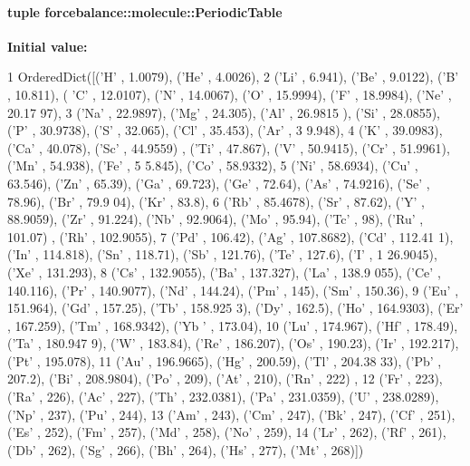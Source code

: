 \hypertarget{namespaceforcebalance_1_1molecule_a00baf2798fd1a1e41c0364e94eafd133}{
\paragraph[{\-Periodic\-Table}]{\setlength{\rightskip}{0pt plus 5cm}tuple {\bf forcebalance\-::molecule\-::\-Periodic\-Table}}}\label{namespaceforcebalance_1_1molecule_a00baf2798fd1a1e41c0364e94eafd133}
{\bfseries \-Initial value\-:}
\begin{DoxyCode}
1 OrderedDict([('H' , 1.0079), ('He' , 4.0026), 
2                              ('Li' , 6.941), ('Be' , 9.0122), ('B' , 10.811), (
      'C' , 12.0107), ('N' , 14.0067), ('O' , 15.9994), ('F' , 18.9984), ('Ne' , 20.17
      97),
3                              ('Na' , 22.9897), ('Mg' , 24.305), ('Al' , 26.9815
      ), ('Si' , 28.0855), ('P' , 30.9738), ('S' , 32.065), ('Cl' , 35.453), ('Ar' , 3
      9.948), 
4                              ('K' , 39.0983), ('Ca' , 40.078), ('Sc' , 44.9559)
      , ('Ti' , 47.867), ('V' , 50.9415), ('Cr' , 51.9961), ('Mn' , 54.938), ('Fe' , 5
      5.845), ('Co' , 58.9332), 
5                              ('Ni' , 58.6934), ('Cu' , 63.546), ('Zn' , 65.39),
       ('Ga' , 69.723), ('Ge' , 72.64), ('As' , 74.9216), ('Se' , 78.96), ('Br' , 79.9
      04), ('Kr' , 83.8), 
6                              ('Rb' , 85.4678), ('Sr' , 87.62), ('Y' , 88.9059),
       ('Zr' , 91.224), ('Nb' , 92.9064), ('Mo' , 95.94), ('Tc' , 98), ('Ru' , 101.07)
      , ('Rh' , 102.9055), 
7                              ('Pd' , 106.42), ('Ag' , 107.8682), ('Cd' , 112.41
      1), ('In' , 114.818), ('Sn' , 118.71), ('Sb' , 121.76), ('Te' , 127.6), ('I' , 1
      26.9045), ('Xe' , 131.293), 
8                              ('Cs' , 132.9055), ('Ba' , 137.327), ('La' , 138.9
      055), ('Ce' , 140.116), ('Pr' , 140.9077), ('Nd' , 144.24), ('Pm' , 145), ('Sm' 
      , 150.36), 
9                              ('Eu' , 151.964), ('Gd' , 157.25), ('Tb' , 158.925
      3), ('Dy' , 162.5), ('Ho' , 164.9303), ('Er' , 167.259), ('Tm' , 168.9342), ('Yb
      ' , 173.04), 
10                              ('Lu' , 174.967), ('Hf' , 178.49), ('Ta' , 180.947
      9), ('W' , 183.84), ('Re' , 186.207), ('Os' , 190.23), ('Ir' , 192.217), ('Pt' ,
       195.078), 
11                              ('Au' , 196.9665), ('Hg' , 200.59), ('Tl' , 204.38
      33), ('Pb' , 207.2), ('Bi' , 208.9804), ('Po' , 209), ('At' , 210), ('Rn' , 222)
      , 
12                              ('Fr' , 223), ('Ra' , 226), ('Ac' , 227), ('Th' , 
      232.0381), ('Pa' , 231.0359), ('U' , 238.0289), ('Np' , 237), ('Pu' , 244), 
13                              ('Am' , 243), ('Cm' , 247), ('Bk' , 247), ('Cf' , 
      251), ('Es' , 252), ('Fm' , 257), ('Md' , 258), ('No' , 259), 
14                              ('Lr' , 262), ('Rf' , 261), ('Db' , 262), ('Sg' , 
      266), ('Bh' , 264), ('Hs' , 277), ('Mt' , 268)])
\end{DoxyCode}


